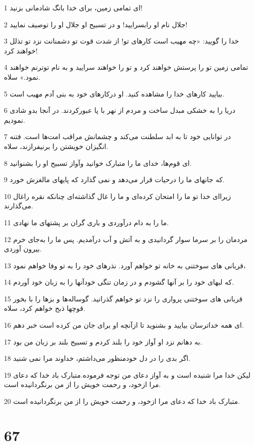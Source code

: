 \par 1 ای تمامی زمین، برای خدا بانگ شادمانی بزنید!
\par 2 جلال نام او رابسرایید! و در تسبیح او جلال او را توصیف نمایید!
\par 3 خدا را گویید: «چه مهیب است کارهای تو! از شدت قوت تو دشمنانت نزد تو تذلل خواهند کرد!
\par 4 تمامی زمین تو را پرستش خواهند کرد و تو را خواهند سرایید و به نام توترنم خواهند نمود.» سلاه.
\par 5 بیایید کارهای خدا را مشاهده کنید. او درکارهای خود به بنی آدم مهیب است.
\par 6 دریا را به خشکی مبدل ساخت و مردم از نهر با پا عبورکردند. در آنجا بدو شادی نمودیم.
\par 7 در توانایی خود تا به ابد سلطنت می‌کند و چشمانش مراقب امت‌ها است. فتنه انگیزان خویشتن را برنیفرازند، سلاه.
\par 8 ‌ای قوم‌ها، خدای ما را متبارک خوانید وآواز تسبیح او را بشنوانید.
\par 9 که جانهای ما را درحیات قرار می‌دهد و نمی گذارد که پایهای مالغزش خورد.
\par 10 زیرا‌ای خدا تو ما را امتحان کرده‌ای و ما را غال گذاشته‌ای چنانکه نقره راغال می‌گذارند.
\par 11 ما را به دام درآوردی و باری گران بر پشتهای ما نهادی.
\par 12 مردمان را بر سرما سوار گردانیدی و به آتش و آب در‌آمدیم. پس ما را به‌جای خرم بیرون آوردی.
\par 13 قربانی های سوختنی به خانه تو خواهم آورد. نذرهای خود را به تو وفا خواهم نمود،
\par 14 که لبهای خود را بر آنها گشودم و در زمان تنگی خودآنها را به زبان خود آوردم.
\par 15 قربانی های سوختنی پرواری را نزد تو خواهم گذرانید. گوساله‌ها و بزها را با بخور قوچها ذبح خواهم کرد، سلاه.
\par 16 ‌ای همه خداترسان بیایید و بشنوید تا ازآنچه او برای جان من کرده است خبر دهم.
\par 17 به دهانم نزد او آواز خود را بلند کردم و تسبیح بلند بر زبان من بود.
\par 18 اگر بدی را در دل خودمنظور می‌داشتم، خداوند مرا نمی شنید.
\par 19 لیکن خدا مرا شنیده است و به آواز دعای من توجه فرموده.متبارک باد خدا که دعای مرا ازخود، و رحمت خویش را از من برنگردانیده است.
\par 20 متبارک باد خدا که دعای مرا ازخود، و رحمت خویش را از من برنگردانیده است.
 
\chapter{67}

